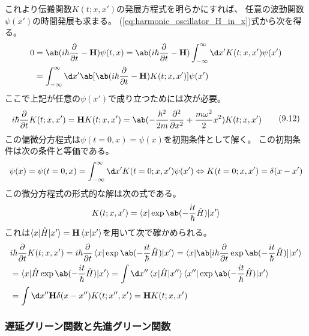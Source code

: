 これより伝搬関数$K(t;x,x')$の発展方程式を明らかにすれば、
任意の波動関数$\psi(x')$の時間発展も求まる。
(\ref{eq:harmonic_oscillator_H_in_x})式から次を得る。
\begin{equation}
  \begin{split}
    0&=\ab(i\hbar\pdv{}{t}-\vb{H})\psi(t,x)
    =\ab(i\hbar\pdv{}{t}-\vb{H})
    \int_{-\infty}^\infty\d x' K(t;x,x')\psi(x') \\
    &=\int_{-\infty}^\infty\d x'
    \ab[\ab(i\hbar\pdv{}{t}-\vb{H})K(t;x,x')]\psi(x') \\
  \end{split}
\end{equation}
ここで上記が任意の$\psi(x')$で成り立つためには次が必要。
\begin{equation}
  \label{eq:propagator_evolution}
  \begin{split}
    i\hbar\pdv{}{t}K(t;x,x')
    =\vb{H}K(t;x,x')
    =\ab(-\frac{\hbar^2}{2m}\pdv[order={2}]{}{x}+\frac{m\omega^2}{2}x^2)K(t;x,x')
  \end{split}
  \tag{9.12}
\end{equation}
この偏微分方程式は$\psi(t=0,x)=\psi(x)$を初期条件として解く。
この初期条件は次の条件と等価である。
\begin{equation}
  \label{eq:propagator_initial}
  \psi(x)=\psi(t=0,x)
  =\int_{-\infty}^\infty\d x'
  K(t=0;x,x')\psi(x')
  \Leftrightarrow
  K(t=0;x,x')=\delta(x-x')
\end{equation}
この微分方程式の形式的な解は次の式である。
\begin{equation}
  \label{eq:symbolic_propagator}
  K(t;x,x')=\braket{x|\exp \ab(-\frac{it}{\hbar}\hat{H})|x'}
\end{equation}
これは$\braket{x|\hat{H}|x'}=\vb{H}\braket{x|x'}$を用いて次で確かめられる。
\begin{equation}
  \label{eq:xp}
  \begin{split}
    &i\hbar\pdv{}{t}K(t;x,x')
    =i\hbar\pdv{}{t}\braket{x|\exp \ab(-\frac{it}{\hbar}\hat{H})|x'}
    =\braket{x|\ab[i\hbar\pdv{}{t}\exp \ab(-\frac{it}{\hbar}\hat{H})]|x'} \\
    &=\braket{x|\hat{H}\exp \ab(-\frac{it}{\hbar}\hat{H})|x'}
    =\int\d x''\braket{x|\hat{H}|x''}\braket{x''|\exp \ab(-\frac{it}{\hbar}\hat{H})|x'} \\
    &=\int\d x''\vb{H}\delta(x-x'')K(t;x'',x')
    =\vb{H}K(t;x,x')
  \end{split}
\end{equation}

\subsubsection{遅延グリーン関数と先進グリーン関数}

